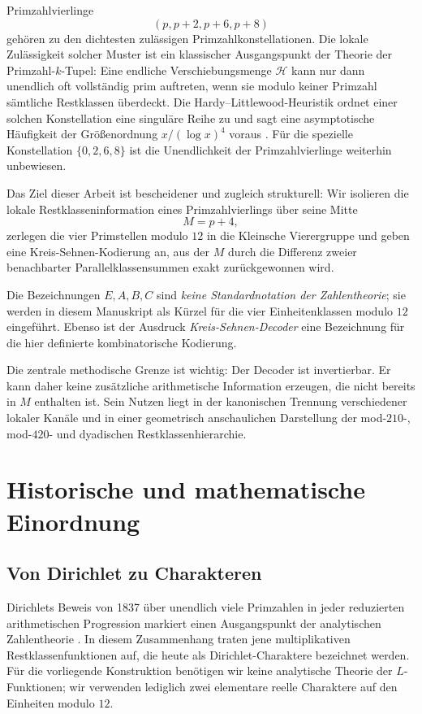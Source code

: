 \documentclass[11pt,a4paper]{article}
\theoremstyle{definition}
\theoremstyle{remark}
\begin{document}
Primzahlvierlinge
\[
(p,p+2,p+6,p+8)
\]
gehören zu den dichtesten zulässigen Primzahlkonstellationen. Die lokale Zulässigkeit solcher Muster ist ein klassischer Ausgangspunkt der Theorie der Primzahl-$k$-Tupel: Eine endliche Verschiebungsmenge $\mathcal H$ kann nur dann unendlich oft vollständig prim auftreten, wenn sie modulo keiner Primzahl sämtliche Restklassen überdeckt. Die Hardy--Littlewood-Heuristik ordnet einer solchen Konstellation eine singuläre Reihe zu und sagt eine asymptotische Häufigkeit der Größenordnung $x/(\log x)^4$ voraus \cite{HardyLittlewood1923,IwaniecKowalski2004}. Für die spezielle Konstellation $\{0,2,6,8\}$ ist die Unendlichkeit der Primzahlvierlinge weiterhin unbewiesen.

Das Ziel dieser Arbeit ist bescheidener und zugleich strukturell: Wir isolieren die lokale Restklasseninformation eines Primzahlvierlings über seine Mitte
\[
M=p+4,
\]
zerlegen die vier Primstellen modulo $12$ in die Kleinsche Vierergruppe und geben eine Kreis-Sehnen-Kodierung an, aus der $M$ durch die Differenz zweier benachbarter Parallelklassensummen exakt zurückgewonnen wird.

Die Bezeichnungen $E,A,B,C$ sind \emph{keine Standardnotation der Zahlentheorie}; sie werden in diesem Manuskript als Kürzel für die vier Einheitenklassen modulo $12$ eingeführt. Ebenso ist der Ausdruck \emph{Kreis-Sehnen-Decoder} eine Bezeichnung für die hier definierte kombinatorische Kodierung.

Die zentrale methodische Grenze ist wichtig: Der Decoder ist invertierbar. Er kann daher keine zusätzliche arithmetische Information erzeugen, die nicht bereits in $M$ enthalten ist. Sein Nutzen liegt in der kanonischen Trennung verschiedener lokaler Kanäle und in einer geometrisch anschaulichen Darstellung der mod-$210$-, mod-$420$- und dyadischen Restklassenhierarchie.

\section{Historische und mathematische Einordnung}

\subsection{Von Dirichlet zu Charakteren}

Dirichlets Beweis von 1837 über unendlich viele Primzahlen in jeder reduzierten arithmetischen Progression markiert einen Ausgangspunkt der analytischen Zahlentheorie \cite{Dirichlet1837}. In diesem Zusammenhang traten jene multiplikativen Restklassenfunktionen auf, die heute als Dirichlet-Charaktere bezeichnet werden. Für die vorliegende Konstruktion benötigen wir keine analytische Theorie der $L$-Funktionen; wir verwenden lediglich zwei elementare reelle Charaktere auf den Einheiten modulo $12$.
\end{document}

